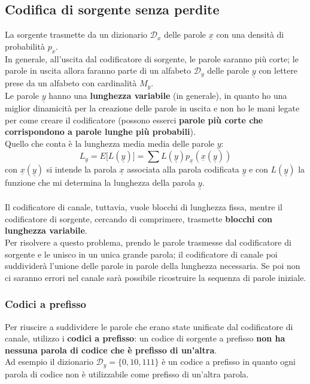 \documentclass{article}
\begin{document}
\subsection{Codifica di sorgente senza perdite}
La sorgente trasmette da un dizionario $\mathcal{D}_x$ delle parole $\underline{x}$ con una densità di probabilità $p_x$.\\
In generale, all'uscita dal codificatore di sorgente, le parole saranno più corte; le parole in uscita allora faranno parte di un alfabeto $\mathcal{D}_y$ delle parole $\underline{y}$ con lettere prese da un alfabeto con cardinalità $M_y$.\\
Le parole $\underline{y}$ hanno una \textbf{lunghezza variabile} (in generale), in quanto ho una miglior dinamicità per la creazione delle parole in uscita e non ho le mani legate per come creare il codificatore (possono esserci \textbf{parole più corte che corrispondono a parole lunghe più probabili}).\\
Quello che conta è la lunghezza media media delle parole $\underline{y}$: $$L_y=E\big[L(\underline{y})\big]=\sum L(\underline{y})p_{\underline{x}}(\underline{x}(\underline{y}))$$
con $\underline{x}(\underline{y})$ si intende la parola $\underline{x}$ associata alla parola codificata $\underline{y}$ e con $L(\underline{y})$ la funzione che mi determina la lunghezza della parola $\underline{y}$.\\\\
Il codificatore di canale, tuttavia, vuole blocchi di lunghezza fissa, mentre il codificatore di sorgente, cercando di comprimere, trasmette \textbf{blocchi con lunghezza variabile}.\\
Per risolvere a questo problema, prendo le parole trasmesse dal codificatore di sorgente e le unisco in un unica grande parola; il codificatore di canale poi suddividerà l'unione delle parole in parole della lunghezza necessaria. Se poi non ci saranno errori nel canale sarà possibile ricostruire la sequenza di parole iniziale.\\

\subsubsection{Codici a prefisso}
Per riuscire a suddividere le parole che erano state unificate dal codificatore di canale, utilizzo i \textbf{codici a prefisso}: un codice di sorgente a prefisso \textbf{non ha nessuna parola di codice che è prefisso di un'altra}.\\
Ad esempio il dizionario $\mathcal{D}_y=\{0,10,111\}$ è un codice a prefisso in quanto ogni parola di codice non è utilizzabile come prefisso di un'altra parola.\\
\end{document}
